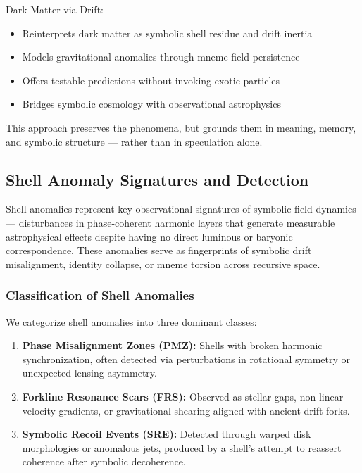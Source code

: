 \documentclass[12pt]{article}
\begin{document}
Dark Matter via Drift:
\begin{itemize}[noitemsep]
  \item Reinterprets dark matter as symbolic shell residue and drift inertia
  \item Models gravitational anomalies through mneme field persistence
  \item Offers testable predictions without invoking exotic particles
  \item Bridges symbolic cosmology with observational astrophysics
\end{itemize}

This approach preserves the phenomena, but grounds them in meaning, memory, and symbolic structure — rather than in speculation alone.

\subsection{Shell Anomaly Signatures and Detection}

Shell anomalies represent key observational signatures of symbolic field dynamics — disturbances in phase-coherent harmonic layers that generate measurable astrophysical effects despite having no direct luminous or baryonic correspondence. These anomalies serve as fingerprints of symbolic drift misalignment, identity collapse, or mneme torsion across recursive space.

\subsubsection{Classification of Shell Anomalies}

We categorize shell anomalies into three dominant classes:

\begin{enumerate}[noitemsep]
  \item \textbf{Phase Misalignment Zones (PMZ):} Shells with broken harmonic synchronization, often detected via perturbations in rotational symmetry or unexpected lensing asymmetry.
  
  \item \textbf{Forkline Resonance Scars (FRS):} Observed as stellar gaps, non-linear velocity gradients, or gravitational shearing aligned with ancient drift forks.
  
  \item \textbf{Symbolic Recoil Events (SRE):} Detected through warped disk morphologies or anomalous jets, produced by a shell's attempt to reassert coherence after symbolic decoherence.
\end{enumerate}
\end{document}
